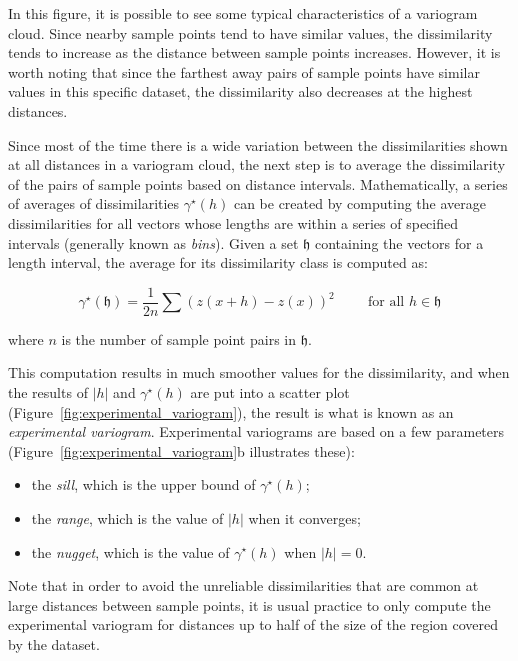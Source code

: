 In this figure, it is possible to see some typical characteristics of a variogram cloud.
Since nearby sample points tend to have similar values, the dissimilarity tends to increase as the distance between sample points increases.
However, it is worth noting that since the farthest away pairs of sample points have similar values in this specific dataset, the dissimilarity also decreases at the highest distances.

Since most of the time there is a wide variation between the dissimilarities shown at all distances in a variogram cloud, the next step is to average the dissimilarity of the pairs of sample points based on distance intervals.
Mathematically, a series of averages of dissimilarities \(\gamma^\star(h)\) can be created by computing the average dissimilarities for all vectors whose lengths are within a series of specified intervals (generally known as \emph{bins}).
Given a set \(\mathfrak{h}\) containing the vectors for a length interval, the average for its dissimilarity class is computed as:

\begin{equation}
\gamma^\star(\mathfrak{h}) = \frac{1}{2n}\sum\left(z\left(x+h\right)-z\left(x\right)\right)^2 \hspace{1cm}\text{for all } h \in \mathfrak{h}
\end{equation}

where \(n\) is the number of sample point pairs in \(\mathfrak{h}\).

This computation results in much smoother values for the dissimilarity, and when the results of \(|h|\) and \(\gamma^\star(h)\) are put into a scatter plot (Figure~\ref{fig:experimental_variogram}), the result is what is known as an \emph{experimental variogram}.
Experimental variograms are based on a few parameters (Figure~\ref{fig:experimental_variogram}b illustrates these): 
\begin{itemize}
  \item the \emph{sill}, which is the upper bound of \(\gamma^\star(h)\); 
  \item the \emph{range}, which is the value of \(|h|\) when it converges; 
  \item the \emph{nugget}, which is the value of \(\gamma^\star(h)\) when \(|h| = 0\).
\end{itemize}
Note that in order to avoid the unreliable dissimilarities that are common at large distances between sample points, it is usual practice to only compute the experimental variogram for distances up to half of the size of the region covered by the dataset.

